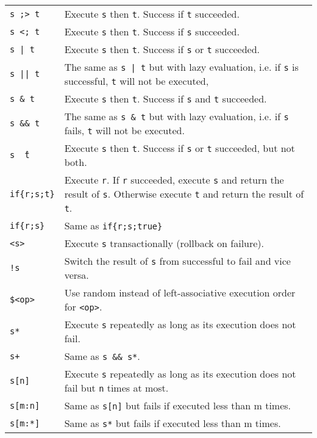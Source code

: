 \begin{table}[htbp]
\begin{minipage}{\linewidth} \renewcommand{\footnoterule}{} 
\begin{tabularx}{\linewidth}{|lX|}
\hline
\texttt{s ;> t}		& Execute \texttt{s} then \texttt{t}. Success if \texttt{t} succeeded.\\
\texttt{s <; t}		& Execute \texttt{s} then \texttt{t}. Success if \texttt{s} succeeded.\\
\texttt{s | t}		& Execute \texttt{s} then \texttt{t}. Success if \texttt{s} or \texttt{t} succeeded.\\
\texttt{s || t}	& The same as \texttt{s | t} but with lazy evaluation, i.e. if \texttt{s} is successful, \texttt{t} will not be executed,\\
\texttt{s \& t}	& Execute \texttt{s} then \texttt{t}. Success if \texttt{s} and \texttt{t} succeeded.\\
\texttt{s \&\& t}	& The same as \texttt{s \& t} but with lazy evaluation, i.e. if \texttt{s} fails, \texttt{t} will not be executed.\\
\texttt{s \^\ t}	& Execute \texttt{s} then \texttt{t}. Success if \texttt{s} or \texttt{t} succeeded, but not both.\\
\texttt{if\{r;s;t\}}	& Execute \texttt{r}. If \texttt{r} succeeded, execute \texttt{s} and return the result of \texttt{s}. Otherwise execute \texttt{t} and return the result of \texttt{t}.\\
\texttt{if\{r;s\}}	& Same as \texttt{if\{r;s;true\}}\\
\texttt{<s>}	& Execute \texttt{s} transactionally (rollback on failure).\\
\texttt{!s}		& Switch the result of \texttt{s} from successful to fail and vice versa.\\
\texttt{\$<op>}	& Use random instead of left-associative execution order for \texttt{<op>}. \\
\texttt{s*}		& Execute \texttt{s} repeatedly as long as its execution does not fail.\\
\texttt{s+}		& Same as \texttt{s \&\& s*}.\\
\texttt{s[n]}	& Execute \texttt{s} repeatedly as long as its execution does not fail but \texttt{n} times at most.\\
\texttt{s[m:n]}	& Same as \texttt{s[n]} but fails if executed less than m times.\\
\texttt{s[m:*]}	& Same as \texttt{s*} but fails if executed less than m times.\\

\end{tabularx}
\end{minipage}
\end{table}
